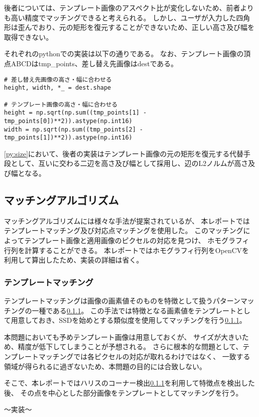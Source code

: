 後者については、テンプレート画像のアスペクト比が変化しないため、前者よりも高い精度でマッチングできると考えられる。
しかし、ユーザが入力した四角形は歪んでおり、元の矩形を復元することができないため、正しい高さ及び幅を取得できない。

それぞれのpythonでの実装は以下の通りである。
なお、テンプレート画像の頂点ABCDはtmp\_points、差し替え先画像はdestである。
\begin{lstlisting}[caption=画像サイズ, label=py:size]
# 差し替え先画像の高さ・幅に合わせる
height, width, *_ = dest.shape

# テンプレート画像の高さ・幅に合わせる
height = np.sqrt(np.sum((tmp_points[1] - tmp_points[0])**2)).astype(np.int16)
width = np.sqrt(np.sum((tmp_points[2] - tmp_points[1])**2)).astype(np.int16)
\end{lstlisting}
\ref{py:size}において、後者の実装はテンプレート画像の元の矩形を復元する代替手段として、互いに交わる二辺を高さ及び幅として採用し、辺のL2ノルムが高さ及び幅となる。

\subsection{マッチングアルゴリズム}
マッチングアルゴリズムには様々な手法が提案されているが、
本レポートではテンプレートマッチング及び対応点マッチングを使用した。
このマッチングによってテンプレート画像と適用画像のピクセルの対応を見つけ、
ホモグラフィ行列を計算することができる。
本レポートではホモグラフィ行列をOpenCVを利用して算出したため、実装の詳細は省く。

\subsubsection{テンプレートマッチング}
テンプレートマッチングは画像の画素値そのものを特徴として扱うパターンマッチングの一種である\ref{}。
この手法では特徴となる画素値をテンプレートとして用意しておき、SSDを始めとする類似度を使用してマッチングを行う\ref{}。

本問題においても予めテンプレート画像は用意しておくが、
サイズが大きいため、精度が低下してしまうことが予想される。
さらに根本的な問題として、テンプレートマッチングでは各ピクセルの対応が取れるわけではなく、
一致する領域が得られるに過ぎないため、本問題の目的には合致しない。

そこで、本レポートではハリスのコーナー検出\ref{}を利用して特徴点を検出した後、
その点を中心とした部分画像をテンプレートとしてマッチングを行う。

～実装～

